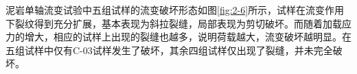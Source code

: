 泥岩单轴流变试验中五组试样的流变破坏形态如图\ref{fig:2-6}所示，试样在流变作用下裂纹得到充分扩展，基本表现为斜拉裂缝，局部表现为剪切破坏。而随着加载应力的增大，相应的试样上出现的裂缝也越多，说明荷载越大，流变破坏越明显。在五组试样中仅有C-03试样发生了破坏，其余四组试样仅出现了裂缝，并未完全破坏。
\begin{figure}[ht!]
    \centering
    \subfigure[C-02]
    {
        \begin{minipage}{6cm}
            \centering

\end{minipage}}
\end{figure}
